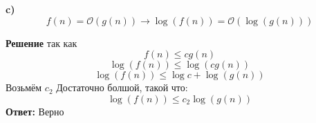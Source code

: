 \documentclass{article}
\begin{document}
\bigskip
\bigskip
\textbf{c)}
\begin{equation*}
    f(n) = \mathcal{O}(g(n)) \longrightarrow \log (f(n)) = \mathcal{O}(\log (g(n)))
\end{equation*}

\textbf{Решение}
так как
\begin{equation*}
    f(n) \leq cg(n)
\end{equation*}
\begin{equation*}
    \log (f(n)) \leq \log (cg(n))
\end{equation*}
\begin{equation*}
    \log (f(n)) \leq \log c + \log (g(n))
\end{equation*}
Возьмём $c_2$ Достаточно болшой, такой что:
\begin{equation*}
    \log (f(n)) \leq c_2\log (g(n))
\end{equation*}
\textbf{Ответ:} Верно
\end{document}
